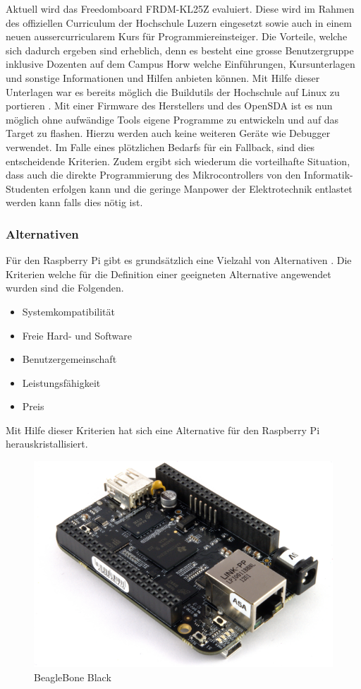 Aktuell wird das Freedomboard FRDM-KL25Z evaluiert. Diese wird im Rahmen
des offiziellen Curriculum der Hochschule Luzern eingesetzt sowie auch
in einem neuen aussercurricularem Kurs für Programmiereinsteiger. Die 
Vorteile, welche sich dadurch ergeben sind erheblich, denn es besteht eine 
grosse Benutzergruppe inklusive Dozenten auf dem Campus Horw welche 
Einführungen, Kursunterlagen und sonstige Informationen und Hilfen anbieten
können. Mit Hilfe dieser Unterlagen war es bereits möglich die Buildutils der 
Hochschule auf Linux zu portieren \cite{ninuxC}. Mit einer Firmware des 
Herstellers und des OpenSDA ist es nun möglich ohne aufwändige Tools eigene
Programme zu entwickeln und auf das Target zu flashen. Hierzu werden auch
keine weiteren Geräte wie Debugger verwendet. Im Falle eines
plötzlichen Bedarfs für ein Fallback, sind dies entscheidende Kriterien.
Zudem ergibt sich wiederum die vorteilhafte Situation, dass auch die direkte 
Programmierung des Mikrocontrollers von den Informatik-Studenten erfolgen
kann und die geringe Manpower der Elektrotechnik entlastet werden kann
falls dies nötig ist.

\subsubsection{Alternativen}
Für den Raspberry Pi gibt es grundsätzlich eine Vielzahl von Alternativen
\cite{elv}. Die Kriterien welche für die Definition einer geeigneten 
Alternative angewendet wurden sind die Folgenden.

\begin{itemize}
	\item Systemkompatibilität
	\item Freie Hard- und Software
	\item Benutzergemeinschaft
	\item Leistungsfähigkeit
	\item Preis
\end{itemize}

Mit Hilfe dieser Kriterien hat sich eine Alternative für den Raspberry
Pi herauskristallisiert.

\begin{figure}[h!]
	\centering
	\includegraphics[scale=0.35]{../../fig/beaglebone-black.png}
	\caption{BeagleBone Black \protect\cite{linuxuser}}
\end{figure}

